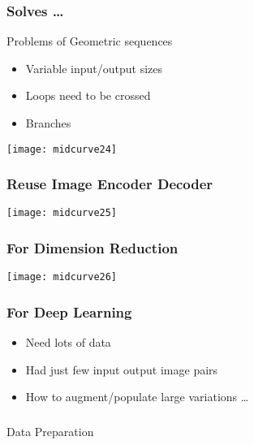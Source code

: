 \begin{frame}[fragile]\frametitle{Solves \ldots}
Problems of Geometric sequences

	\begin{itemize}
	\item Variable input/output sizes
	\item Loops need to be crossed
	\item Branches
	\end{itemize}
\begin{center}
\texttt{[image: midcurve24]}
\end{center}	
\end{frame}

\begin{frame}[fragile]\frametitle{Reuse Image Encoder Decoder}
\begin{center}
\texttt{[image: midcurve25]}
\end{center}	
\end{frame}

\begin{frame}[fragile]\frametitle{For Dimension Reduction}
\begin{center}
\texttt{[image: midcurve26]}
\end{center}	
\end{frame}

\begin{frame}[fragile]\frametitle{For Deep Learning}
	\begin{itemize}
	\item Need lots of data
	\item Had just few input output image pairs
	\item How to augment/populate large variations \ldots
	\end{itemize}
\end{frame}

\begin{frame}[fragile]\frametitle{}
\begin{center}
{\Large Data Preparation}
\end{center}
\end{frame}


